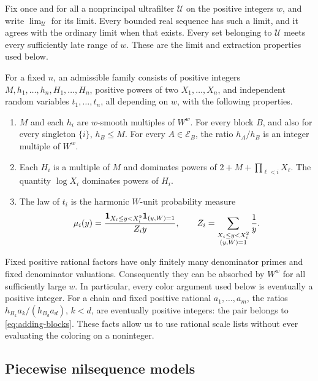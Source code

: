 Fix once and for all a nonprincipal ultrafilter $\mathcal U$ on the
positive integers $w$, and write $\lim_{\mathcal U}$ for its limit.
Every bounded real sequence has such a limit, and it agrees with the
ordinary limit when that exists. Every set belonging to $\mathcal U$
meets every sufficiently late range of $w$. These are the limit and
extraction properties used below.

\begin{definition}\label{def:admissible}
For a fixed $n$, an admissible family consists of positive integers
$M,h_1,\ldots,h_n,H_1,\ldots,H_n$, positive powers of two
$X_1,\ldots,X_n$, and independent random variables $t_1,\ldots,t_n$,
all depending on $w$, with the following properties.
\begin{enumerate}
\item $M$ and each $h_i$ are $w$-smooth multiples of $W^w$.
For every block $B$, and also for every singleton $\{i\}$,
$h_B\le M$. For every $A\in\mathcal E_B$, the ratio $h_A/h_B$
is an integer multiple of $W^w$.
\item Each $H_i$ is a multiple of $M$ and dominates powers of
$2+M+\prod_{\ell<i}X_\ell$. The quantity $\log X_i$ dominates powers
of $H_i$.
\item The law of $t_i$ is the harmonic $W$-unit probability measure
\begin{equation}\label{eq:harmonic-law}
 \mu_i(y)=\frac{\mathbf 1_{X_i\le y<X_i^2}\mathbf 1_{(y,W)=1}}{Z_i y},
 \qquad
 Z_i=\sum_{\substack{X_i\le y<X_i^2\\(y,W)=1}}\frac1y.
\end{equation}
\end{enumerate}
\end{definition}

Fixed positive rational factors have only finitely many denominator
primes and fixed denominator valuations. Consequently they can be
absorbed by $W^w$ for all sufficiently large $w$. In particular, every
color argument used below is eventually a positive integer. For a chain
and fixed positive rational $a_1,\ldots,a_m$, the ratios
$h_{B_k}a_k/(h_{B_d}a_d)$, $k<d$, are eventually positive integers:
the pair belongs to \eqref{eq:adding-blocks}. These facts allow us to
use rational scale lists without ever evaluating the coloring on a
noninteger.

\subsection{Piecewise nilsequence models}

